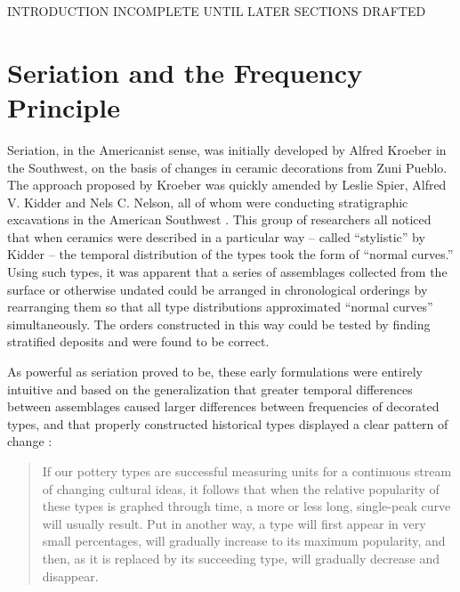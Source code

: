 \documentclass[graybox,natbib]{svmult}
\begin{document}
INTRODUCTION INCOMPLETE UNTIL LATER SECTIONS DRAFTED

\section{Seriation and the Frequency
Principle}\label{seriation-and-the-frequency-principle}

Seriation, in the Americanist sense, was initially developed by Alfred
Kroeber \citep{Kroeber1916} in the Southwest, on the basis of changes in
ceramic decorations from Zuni Pueblo. The approach proposed by Kroeber
was quickly amended by Leslie Spier, Alfred V. Kidder and Nels C.
Nelson, all of whom were conducting stratigraphic excavations in the
American Southwest \citep{Kidder1917, Nelson1916, Spier1917}. This group
of researchers all noticed that when ceramics were described in a
particular way -- called ``stylistic'' by Kidder
\citeyearpar{Kidder1917} -- the temporal distribution of the types took
the form of ``normal curves.'' Using such types, it was apparent that a
series of assemblages collected from the surface or otherwise undated
could be arranged in chronological orderings by rearranging them so that
all type distributions approximated ``normal curves'' simultaneously.
The orders constructed in this way could be tested by finding stratified
deposits and were found to be correct.

As powerful as seriation proved to be, these early formulations were
entirely intuitive and based on the generalization that greater temporal
differences between assemblages caused larger differences between
frequencies of decorated types, and that properly constructed historical
types displayed a clear pattern of change \citep[p.~220]{Phillips1951}:

\begin{quote}
If our pottery types are successful measuring units for a continuous
stream of changing cultural ideas, it follows that when the relative
popularity of these types is graphed through time, a more or less long,
single-peak curve will usually result. Put in another way, a type will
first appear in very small percentages, will gradually increase to its
maximum popularity, and then, as it is replaced by its succeeding type,
will gradually decrease and disappear.
\end{quote}
\end{document}
